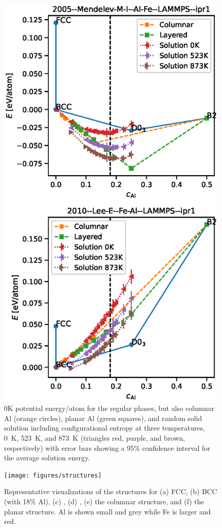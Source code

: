 \begin{figure}[h]
    \centering
    \includegraphics[width=\textwidth,height=0.75\textheight,keepaspectratio]{figures/expanded_0K_phases}
    \caption{0K potential energy/atom for the regular phases, but also columnar Al (orange circles), planar Al (green squares), and random solid solution including configurational entropy at three temperatures, 0~K, 523~K, and 873~K (triangles red, purple, and brown, respectively) with error bars showing a 95\% confidence interval for the average solution energy.}
    \label{fig:expanded_0K_phases}
\end{figure}
%
\begin{figure}[h]
    \centering
    \texttt{[image: figures/structures]}
    \caption{Representative visualizations of the structures for (a) FCC, (b) BCC (with 18\% Al), (c) \DOTHREE, (d) \BTWO, (e) the columnar structure, and (f) the planar structure. Al is shown small and grey while Fe is larger and red.}
    \label{fig:structures}
\end{figure}

